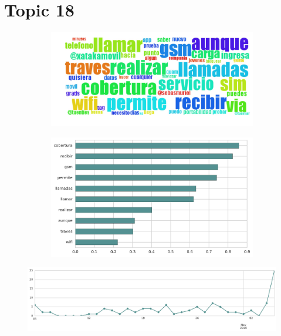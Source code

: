 \section{Topic 18}

\begin{figure}[htbp!]
    \centering
    \begin{subfigure}[b]{0.49\textwidth}
        \includegraphics[width=\textwidth]{twitter_all/report_images/topic-18-wordcloud.jpg}
    \end{subfigure}
    \begin{subfigure}[b]{0.49\textwidth}
        \includegraphics[width=\textwidth]{twitter_all/report_images/topic-18-terms.jpg}
    \end{subfigure}
\end{figure}

\begin{figure}[htbp!]
    \centering
    \includegraphics[width=\textwidth]{twitter_all/report_images/topic-18-timeseries.jpg}
\end{figure}

